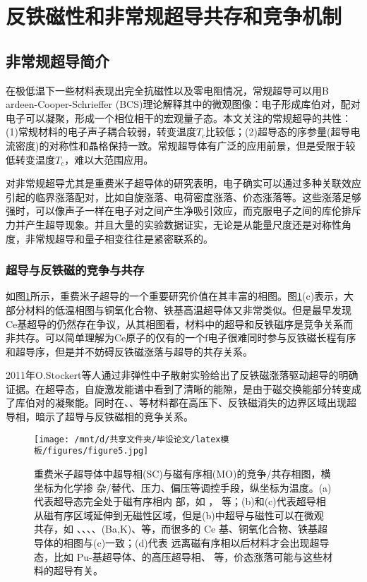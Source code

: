 \section{反铁磁性和非常规超导共存和竞争机制}%
\subsection{非常规超导简介}
在极低温下一些材料表现出完全抗磁性以及零电阻情况，常规超导可以用B\\ardeen-Cooper-Schrieffer (BCS)理论解释其中的微观图像：电子形成库伯对，配对电子可以凝聚，形成一个相位相干的宏观量子态。本文关注的常规超导的共性：(1)常规材料的电子声子耦合较弱，转变温度$T_c$比较低；(2)超导态的序参量(超导电流密度)的对称性和晶格保持一致。常规超导体有广泛的应用前景，但是受限于较低转变温度$T_c$，难以大范围应用。

对非常规超导尤其是重费米子超导体的研究表明，电子确实可以通过多种关联效应引起的临界涨落配对，比如自旋涨落、电荷密度涨落、价态涨落等。这些涨落足够强时，可以像声子一样在电子对之间产生净吸引效应，而克服电子之间的库伦排斥力并产生超导现象。并且大量的实验数据证实，无论是从能量尺度还是对称性角度，非常规超导和量子相变往往是紧密联系的。
\subsubsection{超导与反铁磁的竞争与共存}
如图\ref{fig3}所示，重费米子超导的一个重要研究价值在其丰富的相图。图\ref{fig3}(c)表示，大部分材料的低温相图与铜氧化合物、铁基高温超导体又非常类似。但是最早发现Ce基超导的仍然存在争议，从其相图看，材料中的超导和反铁磁序是竞争关系而非共存。可以简单理解为Ce原子的仅有的一个f电子很难同时参与反铁磁长程有序和超导序，但是并不妨碍反铁磁涨落与超导的共存关系。

2011年O.Stockert等人通过非弹性中子散射实验给出了反铁磁涨落驱动超导的明确证据。在超导态，自旋激发能谱中看到了清晰的能隙，是由于磁交换能部分转变成了库伯对的凝聚能。同时在、、等材料都在高压下、反铁磁消失的边界区域出现超导相，暗示了超导与反铁磁相的竞争关系。



\begin{figure}[h]
    \texttt{[image: /mnt/d/共享文件夹/毕设论文/latex模板/figures/figure5.jpg]}
    \caption{重费米子超导体中超导相(SC)与磁有序相(MO)的竞争/共存相图，横坐标为化学掺 杂/替代、压力、偏压等调控手段，纵坐标为温度。(a)代表超导态完全处于磁有序相内 部，如 ， 等；(b)和(c)代表超导相从磁有序区域延伸到无磁性区域，但是(b)中超导与磁性可以在微观共存，如 、、、、(Ba,K)、等，而很多的 Ce 基、铜氧化合物、铁基超导体的相图与(c)一致；(d)代表 远离磁有序相以后材料才会出现超导态，比如 Pu-基超导体、的高压超导相、 等，价态涨落可能与这些材料的超导有关\cite{9}。}
    \label{fig3}
\end{figure}

